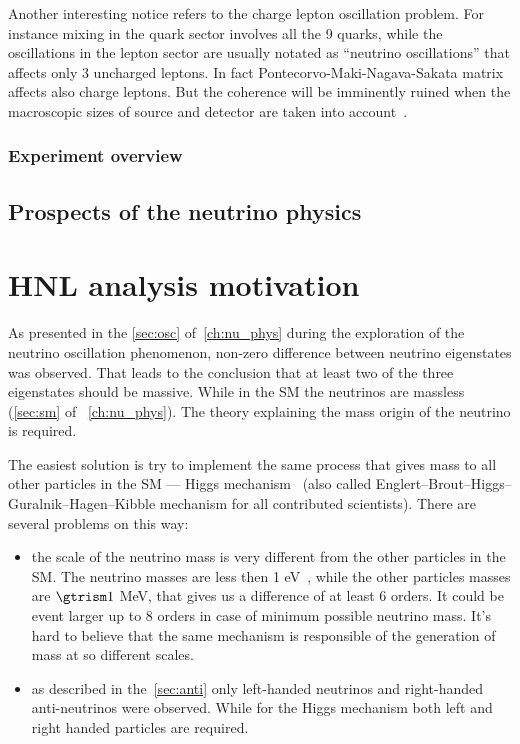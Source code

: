 \documentclass[../main.tex]{subfiles}
\begin{document}
Another interesting notice refers to the charge lepton oscillation problem. For instance mixing in the quark sector involves all the 9 quarks, while the oscillations in the lepton sector are usually notated as ``neutrino oscillations'' that affects only 3 uncharged leptons. In fact Pontecorvo-Maki-Nagava-Sakata matrix affects also charge leptons. But the coherence will be imminently ruined when the macroscopic sizes of source and detector are taken into account~\cite{Akhmedov2007}.

\subsection{Experiment overview}
\label{sec:exp}

\section{Prospects of the neutrino physics}



\chapter{HNL analysis motivation}
\label{ch:intro:HNL}

As presented in the \autoref{sec:osc} of~\autoref{ch:nu_phys} during the exploration of the neutrino oscillation phenomenon, non-zero difference between neutrino eigenstates was observed. That leads to the conclusion that at least two of the three eigenstates should be massive. While in the SM the neutrinos are massless (\autoref{sec:sm} of ~\autoref{ch:nu_phys}). The theory explaining the mass origin of the neutrino is required.

The easiest solution is try to implement the same process that gives mass to all other particles in the SM --- Higgs mechanism~\cite{Higgs1964} (also called Englert–Brout–Higgs–Guralnik–Hagen–Kibble mechanism for all contributed scientists). There are several problems on this way:
\begin{itemize}
  \item the scale of the neutrino mass is very different from the other particles in the SM. The neutrino masses are less then 1 eV~\cite{Aker2019}, while the other particles masses are $\gtrism 1$ MeV, that gives us a difference of at least 6 orders. It could be event larger up to 8 orders in case of minimum possible neutrino mass. It's hard to believe that the same mechanism is responsible of the generation of mass at so different scales.
  \item as described in the~\autoref{sec:anti} only left-handed neutrinos and right-handed anti-neutrinos were observed. While for the Higgs mechanism both left and right handed particles are required.
\end{itemize}
\end{document}
